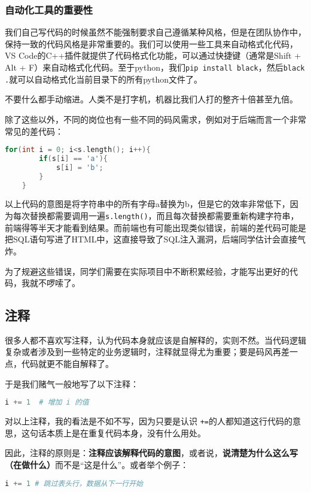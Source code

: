 \documentclass[../main.tex]{subfiles}
\begin{document}
\subsubsection{自动化工具的重要性}
我们自己写代码的时候虽然不能强制要求自己遵循某种风格，但是在团队协作中，保持一致的代码风格是非常重要的。我们可以使用一些工具来自动格式化代码，VS Code的C++插件就提供了代码格式化功能，可以通过快捷键（通常是Shift + Alt + F）来自动格式化代码。至于python，我们\texttt{pip install black}，然后\texttt{black .}就可以自动格式化当前目录下的所有python文件了。

不要什么都手动缩进。人类不是打字机，机器比我们人打的整齐十倍甚至九倍。

除了这些以外，不同的岗位也有一些不同的码风需求，例如对于后端而言一个非常常见的差代码：
\begin{lstlisting}[language=C++]
    for(int i = 0; i<s.length(); i++){
        if(s[i] == 'a'){
            s[i] = 'b';
        }
    }
\end{lstlisting}
以上代码的意图是将字符串中的所有字母a替换为b，但是它的效率非常低下，因为每次替换都需要调用一遍\texttt{s.length()}，而且每次替换都需要重新构建字符串，前端得等半天才能看到结果。而前端也有可能出现类似错误，前端的差代码可能是把SQL语句写进了HTML中，这直接导致了SQL注入漏洞，后端同学估计会直接气炸。

为了规避这些错误，同学们需要在实际项目中不断积累经验，才能写出更好的代码，我就不啰嗦了。

\subsection{注释}

很多人都不喜欢写注释，认为代码本身就应该是自解释的，实则不然。当代码逻辑复杂或者涉及到一些特定的业务逻辑时，注释就显得尤为重要；要是码风再差一点，代码就更不能自解释了。

于是我们赌气一般地写了以下注释：
\begin{lstlisting}[language=Python]
    i += 1  # 增加 i 的值
\end{lstlisting}

对以上注释，我的看法是不如不写，因为只要是认识 \texttt{+=}的人都知道这行代码的意思，这句话本质上是在重复代码本身，没有什么用处。

因此，注释的原则是：\textbf{注释应该解释代码的意图}，或者说，\textbf{说清楚为什么这么写（在做什么）}而不是“这是什么”。或者举个例子：

\begin{lstlisting}[language=Python]
    i += 1 # 跳过表头行，数据从下一行开始
\end{lstlisting}
\end{document}
